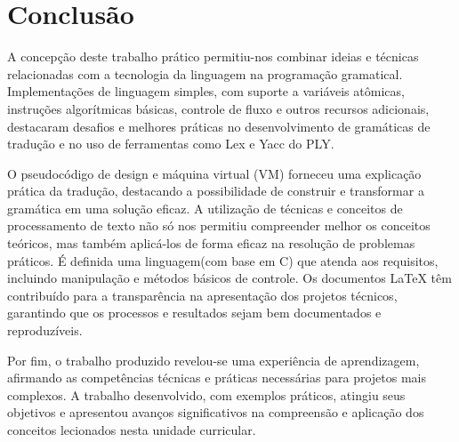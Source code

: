 \documentclass[12pt,a4paper]{report}
\begin{document}
\chapter{Conclus\~{a}o}
A concepção deste trabalho prático permitiu-nos combinar ideias e técnicas relacionadas com a tecnologia da linguagem na programação gramatical. Implementações de linguagem simples, com suporte a variáveis atômicas, instruções algorítmicas básicas, controle de fluxo e outros recursos adicionais, destacaram desafios e melhores práticas no desenvolvimento de gramáticas de tradução e no uso de ferramentas como Lex e Yacc do PLY.

O pseudocódigo de design e máquina virtual (VM) forneceu uma explicação prática da tradução, destacando a possibilidade de construir e transformar a gramática em uma solução eficaz. A utilização de técnicas e conceitos de processamento de texto não só nos permitiu compreender melhor os conceitos teóricos, mas também aplicá-los de forma eficaz na resolução de problemas práticos. É definida uma linguagem(com base em C) que atenda aos requisitos, incluindo manipulação e métodos básicos de controle. Os documentos LaTeX têm contribuído para a transparência na apresentação dos projetos técnicos, garantindo que os processos e resultados sejam bem documentados e reproduzíveis.

Por fim, o trabalho produzido revelou-se uma experiência de aprendizagem, afirmando as competências técnicas e práticas necessárias para projetos mais complexos. A trabalho desenvolvido, com exemplos práticos, atingiu seus objetivos e apresentou avanços significativos na compreensão e aplicação dos conceitos lecionados nesta unidade curricular.
\end{document}
